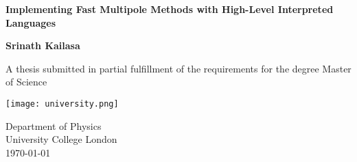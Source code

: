 \begin{titlepage}
    \begin{center}
        \vspace*{1cm}

        \Huge
        \textbf{Implementing Fast Multipole Methods with High-Level Interpreted Languages}

        \Large
        \vspace{0.5cm}

        \vfill

        \textbf{Srinath Kailasa}

        \vspace{5cm}

        A thesis submitted in partial fulfillment of the requirements for the
        degree Master of Science

        \vspace{0.8cm}

        \texttt{[image: university.png]}

        \large
        Department of Physics\\
        University College London\\
        \today

    \end{center}
 \end{titlepage}